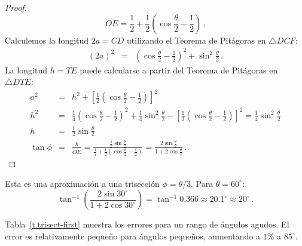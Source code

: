 \begin{proof}
\[
\overline{OE}=\frac{1}{2} + \frac{1}{2}\left(\cos \frac{\theta}{2}-\frac{1}{2}\right)\,.
\]
Calculemos la longitud $2a=\overline{CD}$ utilizando el Teorema de Pitágoras en $\triangle DCF$:
\begin{eqnarray*}
(2a)^2 &=&  \left(\cos \frac{\theta}{2}-\frac{1}{2}\right)^2+\sin^2\frac{\theta}{2}\,.
\end{eqnarray*}
La longitud $h=\overline{TE}$ puede calcularse a partir del Teorema de Pitágoras en $\triangle DTE$:
\begin{eqnarray*}
a^2 &=& h^2 + \left[\frac{1}{2}\left(\cos \frac{\theta}{2}-\frac{1}{2}\right)\right]^2\\
h^2&=&\frac{1}{4}\left(\cos \frac{\theta}{2}-\frac{1}{2}\right)^2+\frac{1}{4}\sin^2\frac{\theta}{2}-\left[\frac{1}{2}\left(\cos \frac{\theta}{2}-\frac{1}{2}\right)\right]^2=
\frac{1}{4}\sin^2\frac{\theta}{2}\\
h&=&\frac{1}{2}\sin\frac{\theta}{2}\\
\tan\phi &=&\frac{h}{\overline{OE}}=\displaystyle\frac{\displaystyle\frac{1}{2}\sin\frac{\theta}{2}}{\displaystyle\frac{1}{2}+\frac{1}{2}\left(\cos \frac{\theta}{2}\! -\! \frac{1}{2}\right)}
=\frac{\displaystyle2\sin\frac{\theta}{2}}{\displaystyle 1+2\cos\frac{\theta}{2}}\,.
\end{eqnarray*}                  
\end{proof}

Esta es una aproximación a una trisección $\phi=\theta/3$. Para $\theta=60^\circ$:
\[
\tan^{-1}\left(\frac{2\sin 30^\circ}{1+2\cos 30^\circ}\right)=
\tan^{-1}0.366\approx 20.1^\circ\approx 20^\circ\,.
\]

Tabla~\ref{t.trisect-first} muestra los errores para un rango de ángulos agudos. El error es relativamente pequeño para ángulos pequeños, aumentando a $1\!\!$\% a $85^\circ$.

